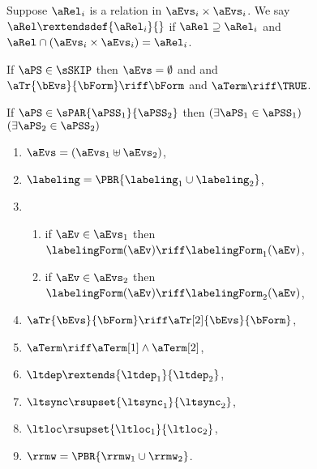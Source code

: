 \begin{figure}
  \raggedright
  \noindent
  Suppose $\aRel_i$ is a relation in $\aEvs_i\times\aEvs_i$.
  We say $\aRel \rextendsdef{\aRel_i}{}$ if
  ${\aRel}\supseteq {\aRel_i}$ and
  $\aRel\cap(\aEvs_i\times \aEvs_i) = \aRel_i$.
  \medskip

  \noindent
  If $\aPS\in\sSKIP$ then $\aEvs = \emptyset$ and
  and $\aTr{\bEvs}{\bForm} \riff \bForm$
  and $\aTerm\riff\TRUE$.
  \medskip

  \noindent
  If $\aPS \in \sPAR{\aPSS_1}{\aPSS_2}$ then  
  $(\exists\aPS_1\in\aPSS_1)$ $(\exists\aPS_2\in\aPSS_2)$
  \begin{multicols}{2}
    \begin{enumerate}[topsep=0pt,label=(\textsc{p}\arabic*),ref=\textsc{p}\arabic*]
    \item \label{par-E}
      $\aEvs = (\aEvs_1\uplus\aEvs_2)$,
    \item \label{par-lambda}
      ${\labeling}=\PBR{{\labeling_1}\cup {\labeling_2}}$, 
    \item[] \setcounter{enumi}{\value{kappa}} 
      \begin{enumerate}[leftmargin=0pt]
      \item \label{par-kappa1} if $\aEv\in\aEvs_1$ then $\labelingForm(\aEv) \riff \labelingForm_1(\aEv)$,
      \item \label{par-kappa2} if $\aEv\in\aEvs_2$ then $\labelingForm(\aEv) \riff \labelingForm_2(\aEv)$,
      \end{enumerate}
    \item \label{par-tau}
      $\aTr{\bEvs}{\bForm} \riff \aTr[2]{\bEvs}{\bForm}$,
    \item \label{par-term}
      $\aTerm \riff \aTerm[1]\land\aTerm[2]$,
    \item \label{par-ledep}
      ${\ltdep}\rextends{\ltdep_1}{\ltdep_2}$, 
    \item \label{par-lesync}
      ${\ltsync}\rsupset{\ltsync_1}{\ltsync_2}$, 
    \item \label{par-leloc}
      ${\ltloc}\rsupset{\ltloc_1}{\ltloc_2}$, 
    \item \label{par-rmw}
      ${\rrmw}=\PBR{{\rrmw_1}\cup{\rrmw_2}}$.
    \end{enumerate}    
  \end{multicols}
  \medskip


\end{figure}
